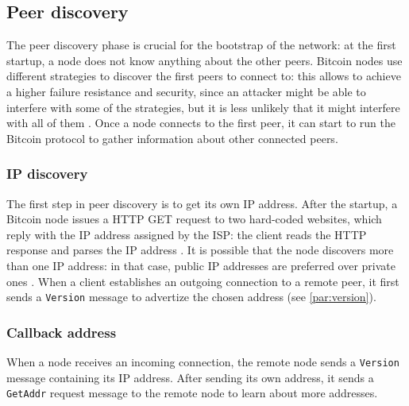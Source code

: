 \subsection{Peer discovery}
\label{sub:discovery}
The peer discovery phase is crucial for the bootstrap of the network:
at the first startup, a node does not know anything about the other peers.
Bitcoin nodes use different strategies to discover the first peers to connect to:
this allows to achieve a higher failure resistance and security, since an attacker might be able to interfere with some of the strategies, but it is less unlikely that it might interfere with all of them \cite{bitcoin_peer_discovery}.
Once a node connects to the first peer, it can start to run the Bitcoin protocol to gather information about other connected peers.

\subsubsection{IP discovery}
The first step in peer discovery is to get its own IP address.
After the startup, a Bitcoin node issues a HTTP GET request to two hard-coded websites, which reply with the IP address assigned by the \ac{ISP}:
the client reads the HTTP response and parses the IP address \cite{bitcoin_peer_discovery}.
It is possible that the node discovers more than one IP address:
in that case, public IP addresses are preferred over private ones \cite{deanonymisation_2014}.
When a client establishes an outgoing connection to a remote peer, it first sends a \texttt{Version} message to advertize the chosen address (see \cref{par:version}).

\subsubsection{Callback address}
When a node receives an incoming connection, the remote node sends a \texttt{Version} message containing its IP address.
After sending its own address, it sends a \texttt{GetAddr} request message to the remote node to learn about more addresses.

